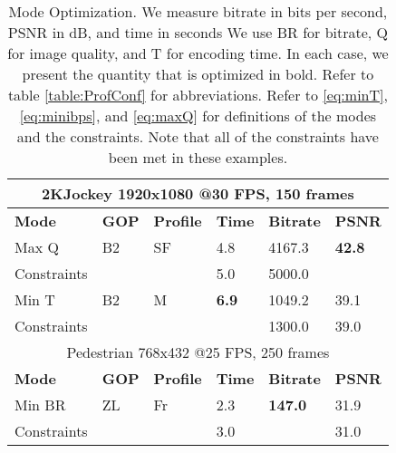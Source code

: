 \documentclass{book}
\begin{document}
	\begin{table}[bt!]
	\caption{Mode Optimization.
	We measure bitrate in bits per second, PSNR in dB, and time in seconds
	We use BR for bitrate, Q for image quality, and T for encoding time.
	In each case, we present the quantity that is optimized in bold.
	Refer to table \ref{table:ProfConf} for abbreviations.
	Refer to \eqref{eq:minT}, \eqref{eq:minibps}, and \eqref{eq:maxQ} for
	definitions of the modes and the constraints. Note that all of the constraints
	have been met in these examples.}
	\label{table:OptimalGOP}
	\begin{tabular}{l|lllll} %
		\multicolumn{6}{c}{2KJockey 1920x1080 @30 FPS, 150 frames}    \\ %
		\hline
		\textbf{Mode}  & \textbf{GOP}  & \textbf{Profile} & \textbf{Time} & \textbf{Bitrate} & \textbf{PSNR} \\ \hline %
		Max Q          &  B2   & SF	& 4.8                 & 4167.3  & \textbf{42.8} \\ 
		Constraints  &          &       & 5.0                 & 5000.0   &                         \\
		\hline
		Min T            &  B2   & M	& \textbf{6.9}   & 1049.2    & 39.1	\\ 
		Constraints   &         &       &                     & 1300.0     & 39.0      \\
		\hline \hline
		\multicolumn{6}{c}{Pedestrian 768x432 @25 FPS, 250 frames}  \\ 
		\hline
		\textbf{Mode}  & \textbf{GOP}  & \textbf{Profile} & \textbf{Time} & \textbf{Bitrate} & \textbf{PSNR} \\ \hline %
		Min BR        & ZL  &Fr  & 2.3 & \textbf{147.0} & 31.9 \\
		Constraints  &       &     & 3.0 &                       & 31.0 \\
		\hline %
	\end{tabular}
\end{table}
	
\end{document}

